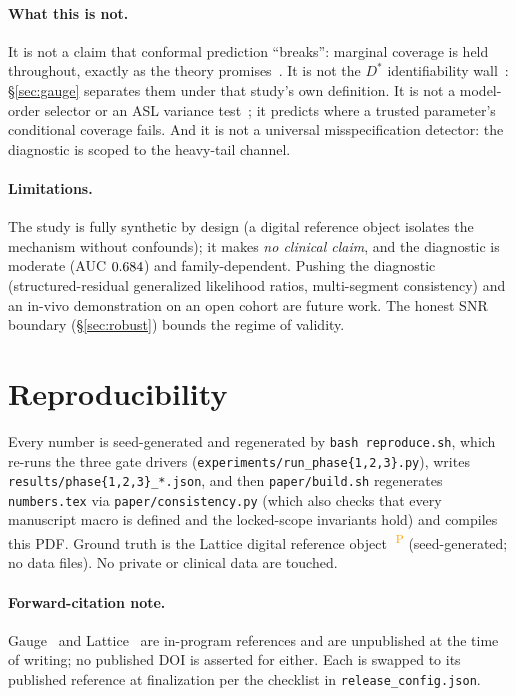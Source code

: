 \documentclass[11pt]{article}
\newcommand{\Dstar}{D^{*}}
\newcommand{\PROV}{\textsuperscript{\textcolor{orange}{\,P}}}
\begin{document}
\paragraph{What this is not.} It is not a claim that conformal prediction
``breaks'': marginal coverage is held throughout, exactly as the theory
promises~\citep{lei2018}. It is not the $\Dstar$ identifiability wall~\citep{gauge}:
\S\ref{sec:gauge} separates them under that study's own definition. It is not a
model-order selector or an ASL variance test~\citep{wangtamirbush2026}; it predicts
where a trusted parameter's conditional coverage fails. And it is not a universal
misspecification detector: the diagnostic is scoped to the heavy-tail channel.

\paragraph{Limitations.} The study is fully synthetic by design (a digital
reference object isolates the mechanism without confounds); it makes \emph{no
clinical claim}, and the diagnostic is moderate (AUC $0.684$) and
family-dependent. Pushing the diagnostic (structured-residual generalized
likelihood ratios, multi-segment consistency) and an in-vivo demonstration on an
open cohort are future work. The honest SNR boundary (\S\ref{sec:robust}) bounds
the regime of validity.

\section*{Reproducibility}
Every number is seed-generated and regenerated by \texttt{bash reproduce.sh}, which
re-runs the three gate drivers (\texttt{experiments/run\_phase\{1,2,3\}.py}),
writes \texttt{results/phase\{1,2,3\}\_*.json}, and then \texttt{paper/build.sh}
regenerates \texttt{numbers.tex} via \texttt{paper/consistency.py} (which also
checks that every manuscript macro is defined and the locked-scope invariants hold)
and compiles this PDF. Ground truth is the Lattice digital reference
object~\citep{lattice}\PROV{} (seed-generated; no data files). No private or
clinical data are touched.

\paragraph{Forward-citation note.}
Gauge~\citep{gauge} and Lattice~\citep{lattice} are in-program references and are
unpublished at the time of writing; no published DOI is asserted for either. Each
is swapped to its published reference at finalization per the checklist in
\texttt{release\_config.json}. %



\end{document}

